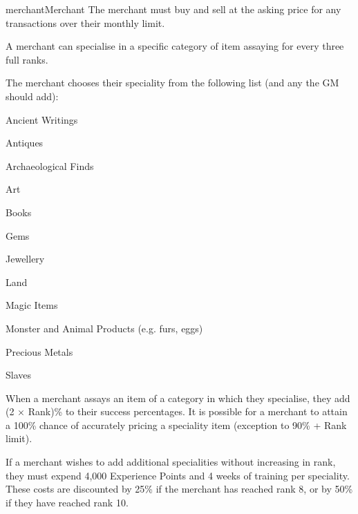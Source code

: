 \begin{Skill}[1.1]{merchant}{Merchant}
The merchant must buy and sell at the asking price for any
transactions over their monthly limit.

A merchant can specialise in a specific category of item assaying for
every three full ranks.

The merchant chooses their speciality from the following list (and any
the GM should add):

\begin{Enumerate}

\item Ancient Writings 
\item Antiques 
\item Archaeological Finds 
\item Art 
\item Books 
\item Gems 
\item Jewellery 
\item Land
\item Magic Items 
\item Monster and Animal Products (e.g. furs, eggs) 
\item Precious Metals 
\item Slaves 

\end{Enumerate}

When a merchant assays an item of a category in which they specialise,
they add (2 × Rank)\% to their success percentages.  It is possible
for a merchant to attain a 100\% chance of accurately pricing a
speciality item (exception to 90\% + Rank limit).

If a merchant wishes to add additional specialities without increasing
in rank, they must expend 4,000 Experience Points and 4 weeks of
training per speciality.  These costs are discounted by 25\% if the
merchant has reached rank 8, or by 50\% if they have reached rank 10.

\end{Skill}
